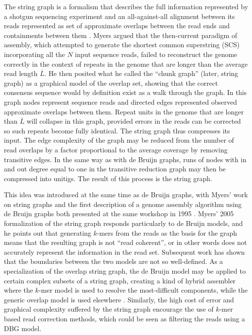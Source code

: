 The string graph is a formalism that describes the full information represented by a shotgun sequencing experiment and an all-against-all alignment between its reads represented as set of approximate overlaps between the read ends and containments between them \cite{myers1995toward,myers2005}.
Myers argued that the then-current paradigm of assembly, which attempted to generate the shortest common superstring (SCS) incorporating all the $N$ input sequence reads, failed to reconstruct the genome correctly in the context of repeats in the genome that are longer than the average read length $\overline{L}$.
He then posited what he called the ``chunk graph'' (later, string graph) as a graphical model of the overlap set, showing that the correct consensus sequence would by definition exist as a walk through the graph.
In this graph nodes represent sequence reads and directed edges represented observed approximate overlaps between them.
Repeat units in the genome that are longer than $\overline{L}$ will collapse in this graph, provided errors in the reads can be corrected so such repeats become fully identical.
The string graph thus compresses its input.
The edge complexity of the graph may be reduced from the number of read overlaps by a factor proportional to the average coverage by removing transitive edges.
In the same way as with de Bruijn graphs, runs of nodes with in and out degree equal to one in the transitive reduction graph may then be compressed into unitigs.
The result of this process is the string graph.

This idea was introduced at the same time as de Bruijn graphs, with Myers' work on string graphs and the first description of a genome assembly algorithm using de Bruijn graphs both presented at the same workshop in 1995 \cite{myers1995toward,idury1995new}.
Myers' 2005 formalization of the string graph \cite{myers2005} responds particularly to de Bruijn models, and he points out that generating $k$-mers from the reads as the basis for the graph means that the resulting graph is not ``read coherent'', or in other words does not accurately represent the information in the read set.
Subsequent work has shown that the boundaries between the two models are not so well-defined.
As a specialization of the overlap string graph, the de Bruijn model may be applied to certain complex subsets of a string graph, creating a kind of hybrid assembler where the $k$-mer model is used to resolve the most-difficult components, while the generic overlap model is used elsewhere \cite{huang2016integration}.
Similarly, the high cost of error and graphical complexity suffered by the string graph encourage the use of $k$-mer based read correction methods, which could be seen as filtering the reads using a DBG model.


